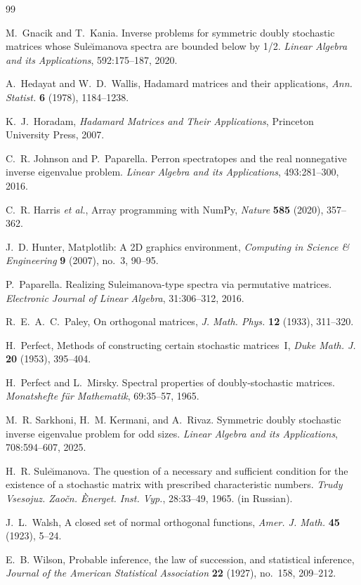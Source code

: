 \documentclass[12pt,fleqn]{amsart}
\theoremstyle{remark}
\newcommand{\1}{\mathbf{1}}
\begin{document}
\newpage

\begin{thebibliography}{99}

M.~Gnacik and T.~Kania.
\newblock Inverse problems for symmetric doubly stochastic matrices whose {Sule{\u{\i}}manova} spectra are bounded below by 1/2.
\newblock \emph{Linear Algebra and its Applications}, 592:175--187, 2020.

A.~Hedayat and W.~D.~Wallis,
\newblock Hadamard matrices and their applications,
\emph{Ann. Statist.} \textbf{6} (1978), 1184--1238.

K.~J.~Horadam,
\newblock \emph{Hadamard Matrices and Their Applications}, Princeton University Press, 2007.

C.~R. Johnson and P.~Paparella.
\newblock Perron spectratopes and the real nonnegative inverse eigenvalue problem.
\newblock \emph{Linear Algebra and its Applications}, 493:281--300, 2016.

C.~R. Harris \emph{et al.}, 
\newblock Array programming with NumPy, 
\emph{Nature} \textbf{585} (2020), 357--362.

J.~D. Hunter, 
\newblock Matplotlib: A 2D graphics environment, 
\emph{Computing in Science \& Engineering} \textbf{9} (2007), no.~3, 90--95.

P.~Paparella.
\newblock Realizing {Suleimanova}-type spectra via permutative matrices.
\newblock \emph{Electronic Journal of Linear Algebra}, 31:306--312, 2016.

R.~E.~A.~C.~Paley,
\newblock On orthogonal matrices, \emph{J. Math. Phys.} \textbf{12} (1933), 311--320.

H.~Perfect,
\newblock Methods of constructing certain stochastic matrices~I,
\emph{Duke Math. J.} \textbf{20} (1953), 395--404.

H.~Perfect and L.~Mirsky.
\newblock Spectral properties of doubly-stochastic matrices.
\newblock \emph{Monatshefte f{\"u}r Mathematik}, 69:35--57, 1965.

M.~R. Sarkhoni, H.~M. Kermani, and A.~Rivaz.
\newblock Symmetric doubly stochastic inverse eigenvalue problem for odd sizes.
\newblock \emph{Linear Algebra and its Applications}, 708:594--607, 2025.

H.~R. Sule{\u{\i}}manova.
\newblock The question of a necessary and sufficient condition for the existence of a stochastic matrix with prescribed characteristic numbers.
\newblock \emph{Trudy Vsesojuz. Zaočn. Ènerget. Inst. Vyp.}, 28:33--49, 1965. (in Russian).

J.~L.~Walsh,
\newblock A closed set of normal orthogonal functions, \emph{Amer. J. Math.} \textbf{45} (1923), 5--24.

E.~B. Wilson, 
\newblock Probable inference, the law of succession, and statistical inference, 
\emph{Journal of the American Statistical Association} \textbf{22} (1927), no.~158, 209--212.

\end{thebibliography}
\end{document}
